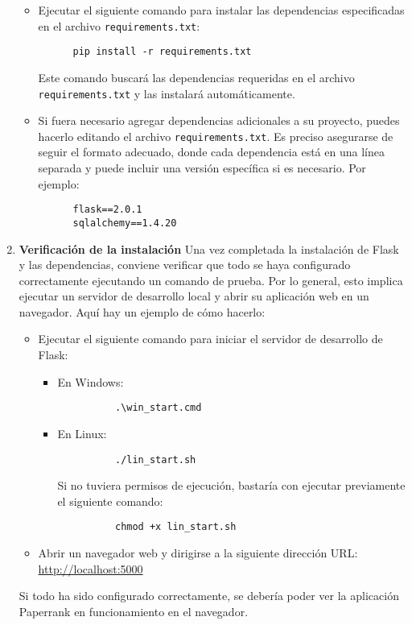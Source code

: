 \begin{enumerate}
   \begin{itemize}
    \item Ejecutar el siguiente comando para instalar las dependencias especificadas en el archivo \texttt{requirements.txt}:
      \begin{verbatim}
      pip install -r requirements.txt
      \end{verbatim}
      Este comando buscará las dependencias requeridas en el archivo \texttt{requirements.txt} y las instalará automáticamente.
    \item Si fuera necesario agregar dependencias adicionales a su proyecto, puedes hacerlo editando el archivo \texttt{requirements.txt}. Es preciso asegurarse de seguir el formato adecuado, donde cada dependencia está en una línea separada y puede incluir una versión específica si es necesario. Por ejemplo:
      \begin{verbatim}
      flask==2.0.1
      sqlalchemy==1.4.20
      \end{verbatim}
  \end{itemize}


\item \textbf{Verificación de la instalación}
   Una vez completada la instalación de Flask y las dependencias, conviene verificar que todo se haya configurado correctamente ejecutando un comando de prueba. Por lo general, esto implica ejecutar un servidor de desarrollo local y abrir su aplicación web en un navegador. Aquí hay un ejemplo de cómo hacerlo:

 \begin{itemize}
    \item Ejecutar el siguiente comando para iniciar el servidor de desarrollo de Flask:
      \begin{itemize}
        \item En Windows:
          \begin{verbatim}
          .\win_start.cmd
          \end{verbatim}
        \item En Linux:
          \begin{verbatim}
          ./lin_start.sh
          \end{verbatim}
          Si no tuviera permisos de ejecución, bastaría con ejecutar previamente el siguiente comando:
          \begin{verbatim}
          chmod +x lin_start.sh
          \end{verbatim}
      \end{itemize}
    \item Abrir un navegador web y dirigirse a la siguiente dirección URL: \url{http://localhost:5000}
  \end{itemize}

   Si todo ha sido configurado correctamente, se debería poder ver la aplicación Paperrank en funcionamiento en el navegador.

\end{enumerate}


